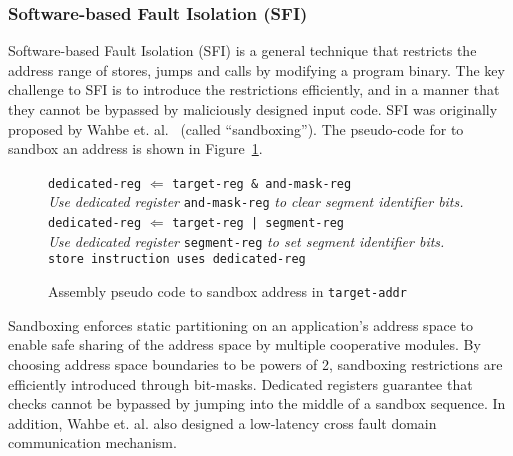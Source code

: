 \subsubsection{Software-based Fault Isolation (SFI)}
%
Software-based Fault Isolation (SFI) is a general technique that
restricts the address range of stores, jumps and calls by modifying a
program binary.
%
The key challenge to SFI is to introduce the restrictions efficiently, and in
a manner that they cannot be bypassed by maliciously designed input
code.
%
SFI was originally proposed by Wahbe et. al.~\cite{wahbe93sfi} (called
``sandboxing'').
%
The pseudo-code for to sandbox an address is shown in
Figure~\ref{fig:sbxpseudocode}.
%

\begin{figure}
 \begin{tabbing}
  \texttt{dedi}\=\texttt{cated-reg} $\Leftarrow$ \texttt{target-reg \&
    and-mask-reg} \\
  \>\emph{Use dedicated register} \texttt{and-mask-reg} \emph{to clear
    segment identifier bits.}\\
  \texttt{dedicated-reg} $\Leftarrow$ \texttt{target-reg |
    segment-reg} \\
  \>\emph{Use dedicated register} \texttt{segment-reg} \emph{to set
    segment identifier bits.}\\
  \texttt{store instruction uses dedicated-reg}
 \end{tabbing}
 \caption{Assembly pseudo code to sandbox address in
   \texttt{target-addr}}
 \label{fig:sbxpseudocode}
\end{figure}
%

Sandboxing enforces static partitioning on an application's address
space to enable safe sharing of the address space by multiple
cooperative modules.
%
By choosing address space boundaries to be powers of 2, sandboxing
restrictions are efficiently introduced through bit-masks.
%
%
Dedicated registers guarantee that checks cannot be bypassed by
jumping into the middle of a sandbox sequence.
%
In addition, Wahbe et. al. also designed a low-latency cross fault
domain communication mechanism.
%

